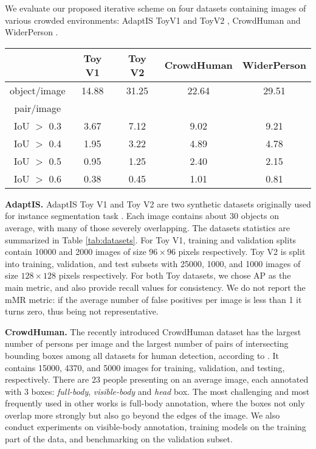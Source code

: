 \documentclass[runningheads]{llncs}
\begin{document}
We evaluate our proposed iterative scheme on four datasets containing images of various crowded environments: AdaptIS ToyV1 and ToyV2 \cite{sofiiuk2019adaptis}, CrowdHuman \cite{shao2018crowdhuman} and WiderPerson \cite{zhang2019widerperson}.

\begin{table*}[t]
    \centering
    \begin{tabular}{c|cccc}
        \hline
        & Toy V1 & Toy V2 & CrowdHuman & WiderPerson \\ \hline \hline
        object/image & 14.88 & 31.25 & 22.64  & 29.51 \\ \hline
        pair/image & & & & \\
        IoU $>$ 0.3 & 3.67 & 7.12 & 9.02 & 9.21\\
        IoU $>$ 0.4 & 1.95 & 3.22 & 4.89 & 4.78\\
        IoU $>$ 0.5 & 0.95 & 1.25 & 2.40 & 2.15\\
        IoU $>$ 0.6 & 0.38 & 0.45 & 1.01 & 0.81\\ \hline
    \end{tabular}
    \caption{Average number of objects and pair-wise overlap between two instances on the four datasets used in our experiments.}
    \label{tab:datasets}
\end{table*}

\textbf{AdaptIS.} AdaptIS Toy V1 and Toy V2 are two synthetic datasets originally used for instance segmentation task \cite{sofiiuk2019adaptis}. Each image contains about 30 objects on average, with many of those severely overlapping. The datasets statistics are summarized in Table \ref{tab:datasets}. For Toy V1, training and validation splits contain 10000 and 2000 images of size $96 \times 96$ pixels respectively. Toy V2 is split into training, validation, and test subsets with 25000, 1000, and 1000 images of size $128 \times 128$ pixels respectively. For both Toy datasets, we chose AP as the main metric, and also provide recall values for consistency. We do not report the mMR metric: if the average number of false positives per image is less than 1 it turns zero, thus being not representative.

\textbf{CrowdHuman.} The recently introduced CrowdHuman dataset has the largest number of persons per image and the largest number of pairs of intersecting bounding boxes among all datasets for human detection, according to \cite{shao2018crowdhuman}. It contains 15000, 4370, and 5000 images for training, validation, and testing, respectively. There are 23 people presenting on an average image, each annotated with 3 boxes: \emph{full-body}, \emph{visible-body} and \emph{head} box. The most challenging and most frequently used in other works is full-body annotation, where the boxes not only overlap more strongly but also go beyond the edges of the image. We also conduct experiments on visible-body annotation, training models on the training part of the data, and benchmarking on the validation subset.
\end{document}
